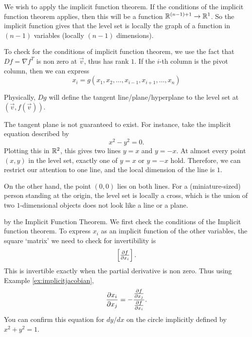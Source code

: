 We wish to apply the implicit function theorem. If the conditions of the implicit function theorem applies, then this will be a function $\mathbb{R}^{(n-1)+1} \to \mathbb{R}^1$. So the implicit function gives that the level set is locally the graph of a function in $(n-1)$ variables (locally $(n-1)$ dimensions).

To check for the conditions of implicit function theorem, we use the fact that $Df = \nabla f^T$ is non zero at $\vec{v}$, thus has rank $1$. If the $i$-th column is the pivot column, then we can express \[
x_i = g(x_1,x_2,\ldots, x_{i-1},x_{i+1},\ldots, x_n)
\]  

Physically, $Dg$ will define the tangent line/plane/hyperplane to the level set at $(\vec{v},f(\vec{v}))$.

The tangent plane is not guaranteed to exist. For instance, take the implicit equation described by \[
    x^2-y^2=0.
\]
Plotting this in $\mathbb{R}^2$, this gives two lines $y=x$ and $y=-x$. At almost every point $(x,y)$ in the level set, exactly one of $y=x$ or $y=-x$ hold. Therefore, we can restrict our attention to one line, and the local dimension of the line is $1$.

On the other hand, the point $(0,0)$ lies on both lines. For a (miniature-sized) person standing at the origin, the level set is locally a cross, which is the union of two $1$-dimensional objects does not look like a line or a plane.

by the Implicit Function Theorem. 
We first check the conditions of the Implicit function theorem. To express $x_i$ as an implicit function of the other variables, the square `matrix' we need to check for invertibility is \[
\begin{bmatrix}
    \pdv{f}{x_i}
\end{bmatrix}.
\]
This is invertible exactly when the partial derivative is non zero. Thus using Example \ref{ex:implicitjacobian}, \[
\pdv{x_i}{x_j}= -\frac{\pdv{f}{x_j}}{\pdv{f}{x_i}}.
\]
You can confirm this equation for $dy/dx$ on the circle implicitly defined by $x^2+y^2=1$.

